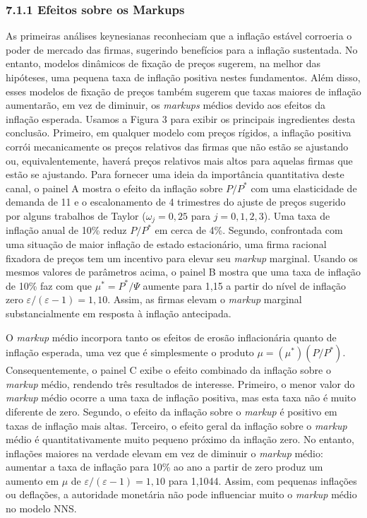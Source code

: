 \documentclass[12pt]{article}
\begin{document}
\subsubsection{7.1.1 Efeitos sobre os Markups} As primeiras análises keynesianas reconheciam que a inflação estável corroeria o poder de mercado das firmas, sugerindo benefícios para a inflação sustentada. No entanto, modelos dinâmicos de fixação de preços sugerem, na melhor das hipóteses, uma pequena taxa de inflação positiva nestes fundamentos. Além disso, esses modelos de fixação de preços também sugerem que taxas maiores de inflação aumentarão, em vez de diminuir, os \textit{markups} médios devido aos efeitos da inflação esperada. Usamos a Figura 3 para exibir os principais ingredientes desta conclusão. Primeiro, em qualquer modelo com preços rígidos, a inflação positiva corrói mecanicamente os preços relativos das firmas que não estão se ajustando ou, equivalentemente, haverá preços relativos mais altos para aquelas firmas que estão se ajustando. Para fornecer uma ideia da importância quantitativa deste canal, o painel A mostra o efeito da inflação sobre $P/P^*$ com uma elasticidade de demanda de 11 e o escalonamento de 4 trimestres do ajuste de preços sugerido por alguns trabalhos de Taylor ($\omega_j = 0,25$ para $j=0, 1, 2, 3$). Uma taxa de inflação anual de 10\% reduz $P/P^*$ em cerca de 4\%. Segundo, confrontada com uma situação de maior inflação de estado estacionário, uma firma racional fixadora de preços tem um incentivo para elevar seu \textit{markup} marginal. Usando os mesmos valores de parâmetros acima, o painel B mostra que uma taxa de inflação de 10\% faz com que $\mu^* = P^*/\Psi$ aumente para 1,15 a partir do nível de inflação zero $\varepsilon/(\varepsilon-1) = 1,10$. Assim, as firmas elevam o \textit{markup} marginal substancialmente em resposta à inflação antecipada.

O \textit{markup} médio incorpora tanto os efeitos de erosão inflacionária quanto de inflação esperada, uma vez que é simplesmente o produto $\mu = (\mu^*) (P/P^*)$. Consequentemente, o painel C exibe o efeito combinado da inflação sobre o \textit{markup} médio, rendendo três resultados de interesse. Primeiro, o menor valor do \textit{markup} médio ocorre a uma taxa de inflação positiva, mas esta taxa não é muito diferente de zero. Segundo, o efeito da inflação sobre o \textit{markup} é positivo em taxas de inflação mais altas. Terceiro, o efeito geral da inflação sobre o \textit{markup} médio é quantitativamente muito pequeno próximo da inflação zero. No entanto, inflações maiores na verdade elevam em vez de diminuir o \textit{markup} médio: aumentar a taxa de inflação para 10\% ao ano a partir de zero produz um aumento em $\mu$ de $\varepsilon/(\varepsilon-1) = 1,10$ para 1,1044. Assim, com pequenas inflações ou deflações, a autoridade monetária não pode influenciar muito o \textit{markup} médio no modelo NNS.
\end{document}
